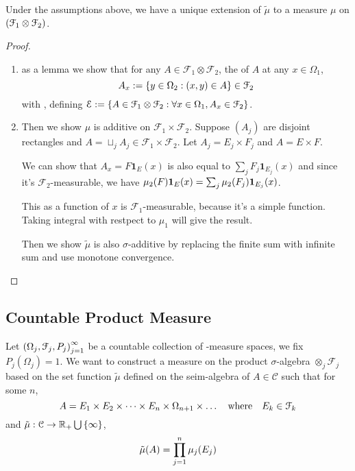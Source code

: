 \begin{thm}
    Under the assumptions above, we have a unique extension of \(\tilde{\mu}\) to a measure \(\mu\) on \(\pqty{\mathcal{F}_{1} \otimes \mathcal{F}_{2} }\). 
\end{thm}
\begin{proof}
    \begin{enumerate}
        \item as a lemma we show that for any \(A \in \mathcal{F}_{1}\otimes \mathcal{F}_{2} \), the  of \(A\) at any \(x \in \Omega_{1}\), 
        \begin{equation*}
            A_{x}:= \Bqty{y\in \Omega_{2}: (x,y) \in A}  \in \mathcal{F}_{2}
        \end{equation*}
        with , defining \(\mathcal{E} := \Bqty{A \in \mathcal{F}_{1} \otimes \mathcal{F}_{2} : \forall x \in\Omega_{1} , A_{x} \in \mathcal{F}_{2}}\).
        
        \item
        Then we show \(\mu\) is additive on \(\mathcal{F}_{1} \times \mathcal{F}_{2}\). Suppose \((A_{j})\) are disjoint rectangles and \( A = \sqcup_{j} A_{j} \in \mathcal{F}_{1}\times \mathcal{F}_{2}\). Let \(A_{j} = E_{j} \times F_{j}\) and \(A = E\times F\).
        
        We can show that \(A_{x} = F \mathbf{1}_{E}(x)  \) is also equal to \(\sum_{j} F_{j} \mathbf{1}_{E_{j}}(x)\) and since it's \(\mathcal{F}_{2}\)-measurable, we have \(\mu_{2}(F)\mathbf{1}_{E}(x) = \sum_{j} \mu_{2}\pqty{F_{j}} \mathbf{1}_{E_{j}}(x)\).

    This as a function of \(x\) is \(\mathcal{F}_{1}\)-measurable, because it's a simple function. Taking integral with restpect to \(\mu_{1}\) will give the result.
     
    Then we show \(\tilde{\mu}\) is also \(\sigma\)-additive by replacing the finite sum with infinite sum and use monotone convergence.
    \end{enumerate}
\end{proof}


\subsection{Countable Product Measure}

Let \(\pqty{\Omega_{j}, \mathcal{F}_{j}, P_{j}}_{j = 1}^{\infty}\) be a countable collection of -measure spaces, we fix \(P_{j}(\Omega_{j}) = 1\). We want to construct a measure on the product \(\sigma\)-algebra \(\otimes_{j} \mathcal{F}_{j}\) based on the set function \(\tilde{\mu}\) defined on the seim-algebra of  \(A \in \mathcal{C}\) such that for some \(n\), 
\begin{equation*}
    A = E_{1} \times E_{2} \times \dots \times E_{n} \times \Omega_{n+1} \times \dots \qq{where} E_{k} \in \mathcal{F}_{k}
\end{equation*}
and \(\tilde{\mu}: \mathcal{C} \to \mathbb{R}_{+}\cup \Bqty{\infty}\),
\begin{equation*}
    \tilde{\mu}(A) = \prod_{j = 1}^{n} \mu_{j}\pqty{E_{j}}
\end{equation*}

